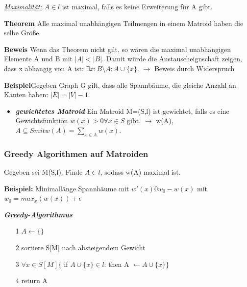 \underline{\textit{Maximalität:}} \newline $A \in l$ ist maximal, falls es keine Erweiterung für A gibt. \newline

\textbf{Theorem} \newline Alle maximal unabhängigen Teilmengen in einem Matroid haben die selbe Größe.

\textbf{Beweis} \newline Wenn das Theorem nicht gilt, so wären die maximal unabhängigen Elemente A und B mit $|A| < |B|$. Damit würde die Austauscheignschaft zeigen, dass x abhängig von A ist: $\exists x: B\setminus A: A \cup \{x\}$. $\rightarrow$ Beweis durch Widerspruch\newline

\textbf{Beispiel}\newline Gegeben Graph G gilt, dass alle Spannbäume, die gleiche Anzahl an Kanten haben: $|E| = |V| - 1$. \newline
\begin{itemize}
	\item \textbf{\textit{gewichtetes Matroid}} \newline Ein Matroid M=(S,l) ist gewichtet, falls es eine Gewichtsfunktion $w(x) > 0 \forall x \in S$ gibt. $\rightarrow$ w(A), $A \subseteq S mit w(A) = \sum_{x \in A} w(x)$.
\end{itemize}

\subsubsection{Greedy Algorithmen auf Matroiden}

Gegeben sei M(S,l). Finde $A \in l$, sodass w(A) maximal ist.\newline

\textbf{Beispiel:} Minimallänge Spannbäume mit \newline $w'(x) 0 w_0 - w(x)$ mit $w_0 = max_{x}(w(x)) + \epsilon$ \newline

\textbf{\textit{Greedy-Algorithmus}}
\begin{itemize}
	\item[1] $A \leftarrow \{ \}$
	\item[2] sortiere S[M] nach absteigendem Gewicht
	\item[3] $\forall x \in S[M] \{$ if $A\cup \{x\} \in l$: then A $\leftarrow A \cup \{x\}\}$
	\item[4] return A
\end{itemize}


